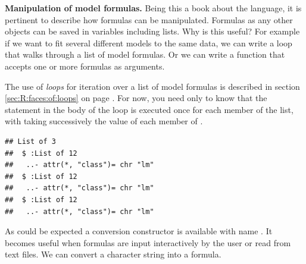\documentclass[krantz2]{krantz}\usepackage{knitr}%
\begin{document}
\begin{explainbox}
\textbf{Manipulation of model formulas.} Being this a book about the \Rlang language, it is pertinent to describe how formulas can be manipulated. Formulas as any other \Rlang objects can be saved in variables including lists. Why is this useful? For example if we want to fit several different models to the same data, we can write a  loop that walks through a list of model formulas. Or we can write a function that accepts one or more formulas as arguments.

The use of  \emph{loops} for iteration over a list of model formulas is described in section \ref{sec:R:faces:of:loops} on page \pageref{sec:R:faces:of:loops}. For now, you need only to know that the statement in the body of the loop is executed once for each member of the  list, with  taking successively the value of each member of .

\begin{knitrout}\footnotesize
{}\color{fgcolor}\begin{kframe}
\begin{alltt}
 \hlkwb{<-} \hlstd{(} \hlstd{=} \hlopt{:}\hlstd{,}  \hlstd{= (}\hlopt{:}\hlstd{)} \hlopt{/}  \hlopt{+} \hlstd{(}\hlstd{))}
 \hlkwb{<-} \hlstd{()}
 \hlkwb{<-} \hlstd{(}  \hlopt{~}  \hlopt{-} \hlstd{,}   \hlopt{~}    \hlopt{~}  \hlopt{+} \hlopt{^}\hlstd{)}
   
  \hlkwb{<-}  \hlstd{(}  
 \hlstd{\}}
  \hlstd{=} \hlstd{)}
\end{alltt}
\begin{verbatim}
## List of 3
##  $ :List of 12
##   ..- attr(*, "class")= chr "lm"
##  $ :List of 12
##   ..- attr(*, "class")= chr "lm"
##  $ :List of 12
##   ..- attr(*, "class")= chr "lm"
\end{verbatim}
\end{kframe}
\end{knitrout}

As could be expected a conversion constructor is available with name . It becomes useful when formulas are input interactively by the user or read from text files. We can convert a character string into a formula.


\end{explainbox}
\end{document}

